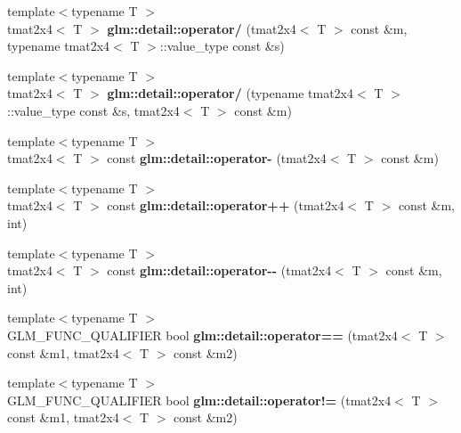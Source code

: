 \begin{DoxyCompactItemize}
\item 
\hypertarget{namespaceglm_1_1detail_aaacb0526d0d29d7c41e549bf84d04a2e}{{\footnotesize template$<$typename T $>$ }\\tmat2x4$<$ \-T $>$ {\bfseries glm\-::detail\-::operator/} (tmat2x4$<$ \-T $>$ const \&m, typename tmat2x4$<$ \-T $>$\-::value\-\_\-type const \&s)}\label{namespaceglm_1_1detail_aaacb0526d0d29d7c41e549bf84d04a2e}

\item 
\hypertarget{namespaceglm_1_1detail_af874efeef0966a741c88d5d94ec5fac2}{{\footnotesize template$<$typename T $>$ }\\tmat2x4$<$ \-T $>$ {\bfseries glm\-::detail\-::operator/} (typename tmat2x4$<$ \-T $>$\-::value\-\_\-type const \&s, tmat2x4$<$ \-T $>$ const \&m)}\label{namespaceglm_1_1detail_af874efeef0966a741c88d5d94ec5fac2}

\item 
\hypertarget{namespaceglm_1_1detail_aa8957e03c5c8e009f296bf27dc268a74}{{\footnotesize template$<$typename T $>$ }\\tmat2x4$<$ \-T $>$ const {\bfseries glm\-::detail\-::operator-\/} (tmat2x4$<$ \-T $>$ const \&m)}\label{namespaceglm_1_1detail_aa8957e03c5c8e009f296bf27dc268a74}

\item 
\hypertarget{namespaceglm_1_1detail_ad7902cde399589d1984fe12f32490efc}{{\footnotesize template$<$typename T $>$ }\\tmat2x4$<$ \-T $>$ const {\bfseries glm\-::detail\-::operator++} (tmat2x4$<$ \-T $>$ const \&m, int)}\label{namespaceglm_1_1detail_ad7902cde399589d1984fe12f32490efc}

\item 
\hypertarget{namespaceglm_1_1detail_a3c8f90c0d6330ae65f0065128bc9abc8}{{\footnotesize template$<$typename T $>$ }\\tmat2x4$<$ \-T $>$ const {\bfseries glm\-::detail\-::operator-\/-\/} (tmat2x4$<$ \-T $>$ const \&m, int)}\label{namespaceglm_1_1detail_a3c8f90c0d6330ae65f0065128bc9abc8}

\item 
\hypertarget{namespaceglm_1_1detail_ac198d1c5283e3e7c2076c4b6a9f235b1}{{\footnotesize template$<$typename T $>$ }\\\-G\-L\-M\-\_\-\-F\-U\-N\-C\-\_\-\-Q\-U\-A\-L\-I\-F\-I\-E\-R bool {\bfseries glm\-::detail\-::operator==} (tmat2x4$<$ \-T $>$ const \&m1, tmat2x4$<$ \-T $>$ const \&m2)}\label{namespaceglm_1_1detail_ac198d1c5283e3e7c2076c4b6a9f235b1}

\item 
\hypertarget{namespaceglm_1_1detail_a09a22ccea6a744560cb579b24da8f30a}{{\footnotesize template$<$typename T $>$ }\\\-G\-L\-M\-\_\-\-F\-U\-N\-C\-\_\-\-Q\-U\-A\-L\-I\-F\-I\-E\-R bool {\bfseries glm\-::detail\-::operator!=} (tmat2x4$<$ \-T $>$ const \&m1, tmat2x4$<$ \-T $>$ const \&m2)}\label{namespaceglm_1_1detail_a09a22ccea6a744560cb579b24da8f30a}

\end{DoxyCompactItemize}


